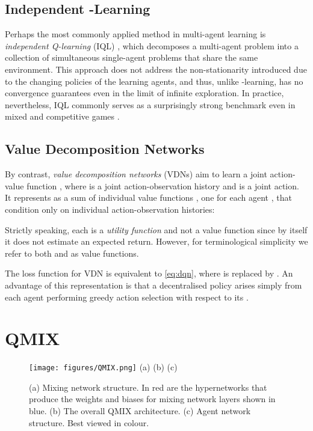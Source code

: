 \documentclass{article}
\begin{document}
\subsection{Independent -Learning}

Perhaps the most commonly applied method in multi-agent learning is \textit{independent Q-learning} (IQL) \cite{tan_multi-agent_1993}, which decomposes a multi-agent problem into a collection of simultaneous single-agent problems that share the same environment. This approach does not address the non-stationarity introduced due to the changing policies of the learning agents, and thus, unlike -learning, has no convergence guarantees even in the limit of infinite exploration. In practice, nevertheless, IQL commonly serves as a surprisingly strong benchmark even in mixed and competitive games \cite{tampuu_multiagent_2015, leibo_multi-agent_2017}.


\subsection{Value Decomposition Networks}

By contrast, \textit{value decomposition networks} (VDNs) \citep{sunehag_value-decomposition_2017} aim to learn a joint action-value function , where  is a joint action-observation history and  is a joint action.  It represents  as a sum of individual value functions , one for each agent , that condition only on individual action-observation histories:

Strictly speaking, each  is a \textit{utility function} \cite{guestrin_multiagent_2002} and not a value function since by itself it does not estimate an expected return.  However, for terminological simplicity we refer to both  and  as value functions.

The loss function for VDN is equivalent to \eqref{eq:dqn}, where  is replaced by .  An advantage of this representation is that a decentralised policy arises simply from each agent performing greedy action selection with respect to its . 
\section{QMIX}

\begin{figure*}[h!tb]
	\centering
	\texttt{[image: figures/QMIX.png]}
	\text{~~~~~~~~~~~~~~~~~~~~~~~}(a) \hfill (b) \hfill (c) \text{~~~~~~~~~~~~~~~~~~~~}
	\caption{(a) Mixing network structure. In red are the hypernetworks that produce the weights and biases for mixing network layers shown in blue. (b) The overall QMIX architecture. (c) Agent network structure. Best viewed in colour.}
	\label{fig:QMIX}
\end{figure*}
\end{document}
